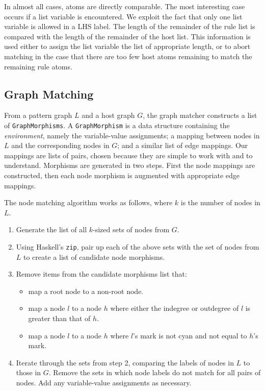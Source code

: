 In almost all cases, atoms are directly comparable. The most interesting case occurs if a list variable is encountered. We exploit the fact that only one list variable is allowed in a LHS label. The length of the remainder of the rule list is compared with the length of the remainder of the host list. This information is used either to assign the list variable the list of appropriate length, or to abort matching in the case that there are too few host atoms remaining to match the remaining rule atoms.

\subsection{Graph Matching}

From a pattern graph $L$ and a host graph $G$, the graph matcher constructs a list of \texttt{GraphMorphisms}. A \texttt{GraphMorphism} is a data structure containing the \textit{environment}, namely the variable-value assignments; a mapping between nodes in $L$ and the corresponding nodes in $G$; and a similar list of edge mappings. Our mappings are lists of pairs, chosen because they are simple to work with and to understand. Morphisms are generated in two steps. First the node mappings are constructed, then each node morphism is augmented with appropriate edge mappings. 

The node matching algorithm works as follows, where $k$ is the number of nodes in $L$. 

\begin{enumerate}
\item Generate the list of all $k$-sized sets of nodes from $G$.
\item Using Haskell's \texttt{zip}, pair up each of the above sets with the set of nodes from $L$ to create a list of candidate node morphisms.
\item Remove items from the candidate morphisms list that:
  \begin{itemize}
  \item map a root node to a non-root node.
  \item map a node $l$ to a node $h$ where either the indegree or outdegree of $l$ is greater than that of $h$.
  \item map a node $l$ to a node $h$ where $l$'s mark is not cyan and not equal to $h$'s mark.
  \end{itemize}
\item Iterate through the sets from step 2, comparing the labels of nodes in $L$ to those in $G$. Remove the sets in which node labels do not match for all pairs of nodes. Add any variable-value assignments as necessary.
\end{enumerate}

